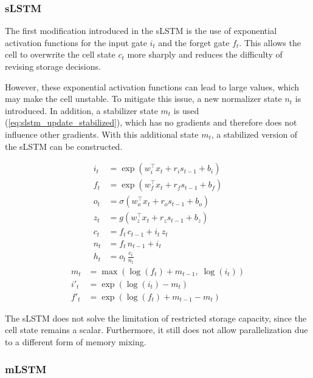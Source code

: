 \documentclass[a4paper,oneside,10pt,ngerman,english]{scrartcl}
\begin{document}
\subsubsection{sLSTM}
\label{sec:slstm}

The first modification introduced in the sLSTM is the use of exponential activation functions for the input gate $i_t$ and the forget gate $f_t$. This allows the cell to overwrite the cell state $c_t$ more sharply and reduces the difficulty of revising storage decisions.

However, these exponential activation functions can lead to large values, which may make the cell unstable. To mitigate this issue, a new normalizer state $n_t$ is introduced. In addition, a stabilizer state $m_t$ is used (\autoref{eq:slstm_update_stabilized}), which has no gradients and therefore does not influence other gradients. With this additional state $m_t$, a stabilized version of the sLSTM can be constructed.

\begin{align}
	i_t &= \exp\!\left(w_i^{\top} x_t + r_i s_{t-1} + b_i\right) \\
	f_t &= \exp\!\left(w_f^{\top} x_t + r_f s_{t-1} + b_f\right) \\
	o_t &= \sigma\!\left(w_o^{\top} x_t + r_o s_{t-1} + b_o\right) \\
	z_t &= g\!\left(w_z^{\top} x_t + r_z s_{t-1} + b_z\right) \\[6pt]
	c_t &= f_t\, c_{t-1} + i_t\, z_t \\
	n_t &= f_t\, n_{t-1} + i_t \\[6pt]
	h_t &= o_t\, \frac{c_t}{n_t}
	\label{eq:slstm_update}
\end{align}
\begin{align}
	\label{eq:slstm_update_stabilized}
	m_t &= \max\!\left(\log(f_t) + m_{t-1}, \; \log(i_t)\right) \\
	i'_t &= \exp\!\left(\log(i_t) - m_t \right) \\
	f'_t &= \exp\!\left(\log(f_t) + m_{t-1} - m_t \right)
\end{align}

The sLSTM does not solve the limitation of restricted storage capacity, since the cell state remains a scalar. Furthermore, it still does not allow parallelization due to a different form of memory mixing.

\subsubsection{mLSTM}
\label{sec:mlstm}
\end{document}

